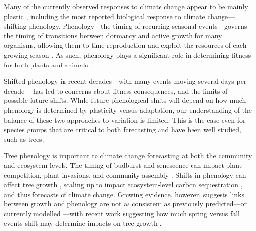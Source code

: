 \documentclass{article}
\begin{document}
Many of the currently observed responses to climate change appear to be mainly plastic \citep{burton22,zettle21,bonamour19, king17}, including the most reported biological response to climate change---shifting phenology. Phenology---the timing of recurring seasonal events---governs the timing of transitions between dormancy and active growth for many organisms, allowing them to time reproduction and exploit the resources of each growing season \citep{chuine10,hanninen11,rytteri21,posle18}. As such, phenology plays a significant role in determining fitness for both plants \citep{guo22,chuine01} and animals \citep{wann19,renner18,chu17}. 

Shifted phenology in recent decades---with many events moving several days per decade \citep{vita21,khar18,Menzel06}---has led to concerns about fitness consequences, and the limits of possible future shifts. While future phenological shifts will depend on how much phenology is determined by plasticity versus adaptation, our understanding of the balance of these two approaches to variation is limited. This is the case even for species groups that are critical to both forecasting and have been well studied, such as trees. 

Tree phenology is important to climate change forecasting at both the community and ecosystem levels. The timing of budburst and senescence can impact plant competition, plant invasions, and community assembly \citep{fridley12}. Shifts in phenology can affect tree growth \citep{myneni97}, scaling up to impact ecosystem-level carbon sequestration \citep{Barichivich12}, and thus forecasts of climate change. Growing evidence, however, suggests links between growth and phenology are not as consistent as previously predicted---or currently modelled \citep{dow22}---with recent work suggesting how much spring versus fall events shift may determine impacts on tree growth \citep{zohner23}. 
\end{document}
